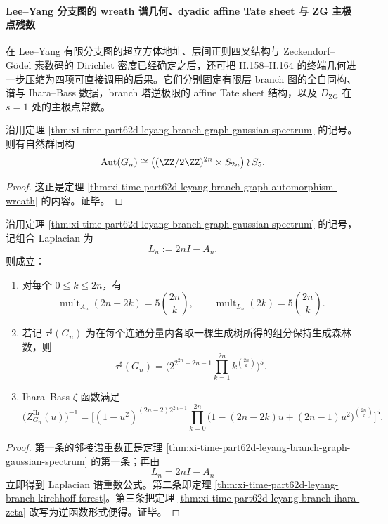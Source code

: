 \paragraph{Lee--Yang 分支图的 wreath 谱几何、dyadic affine Tate sheet 与 ZG 主极点残数}
在 Lee--Yang 有限分支图的超立方体地址、层间正则四叉结构与 Zeckendorf--Gödel 素数码的 Dirichlet 密度已经确定之后，还可把 H.158--H.164 的终端几何进一步压缩为四项可直接调用的后果。它们分别固定有限层 branch 图的全自同构、谱与 Ihara--Bass 数据，branch 塔逆极限的 affine Tate sheet 结构，以及 \(D_{\mathrm{ZG}}\) 在 \(s=1\) 处的主极点常数。

\begin{theorem}\label{thm:xi-time-part62dh-leyang-branch-hyperoctahedral-wreath}
沿用定理 \ref{thm:xi-time-part62d-leyang-branch-graph-gaussian-spectrum} 的记号。则有自然群同构
\[
\operatorname{Aut}(G_n)
\cong
\bigl((\ZZ/2\ZZ)^{2n}\rtimes S_{2n}\bigr)\wr S_5.
\]
\end{theorem}
\begin{proof}
这正是定理 \ref{thm:xi-time-part62d-leyang-branch-graph-automorphism-wreath} 的内容。证毕。
\end{proof}

\begin{corollary}\label{cor:xi-time-part62dh-leyang-branch-spectrum-forest-ihara}
沿用定理 \ref{thm:xi-time-part62d-leyang-branch-graph-gaussian-spectrum} 的记号，记组合 Laplacian 为
\[
L_n:=2nI-A_n.
\]
则成立：
\begin{enumerate}
  \item 对每个 \(0\le k\le 2n\)，有
  \[
  \operatorname{mult}_{A_n}(2n-2k)=5\binom{2n}{k},
  \qquad
  \operatorname{mult}_{L_n}(2k)=5\binom{2n}{k}.
  \]
  \item 若记 \(\tau^\sharp(G_n)\) 为在每个连通分量内各取一棵生成树所得的组分保持生成森林数，则
  \[
  \tau^\sharp(G_n)
  =
  \Biggl(
  2^{2^{2n}-2n-1}
  \prod_{k=1}^{2n}k^{\binom{2n}{k}}
  \Biggr)^5.
  \]
  \item Ihara--Bass \(\zeta\) 函数满足
  \[
  \bigl(Z_{G_n}^{\mathrm{Ih}}(u)\bigr)^{-1}
  =
  \Biggl[
  (1-u^2)^{(2n-2)2^{2n-1}}
  \prod_{k=0}^{2n}
  \bigl(1-(2n-2k)u+(2n-1)u^2\bigr)^{\binom{2n}{k}}
  \Biggr]^5.
  \]
\end{enumerate}
\end{corollary}
\begin{proof}
第一条的邻接谱重数正是定理 \ref{thm:xi-time-part62d-leyang-branch-graph-gaussian-spectrum} 的第一条；再由
\[
L_n=2nI-A_n
\]
立即得到 Laplacian 谱重数公式。第二条即定理 \ref{thm:xi-time-part62d-leyang-branch-kirchhoff-forest}。第三条把定理 \ref{thm:xi-time-part62d-leyang-branch-ihara-zeta} 改写为逆函数形式便得。证毕。
\end{proof}

